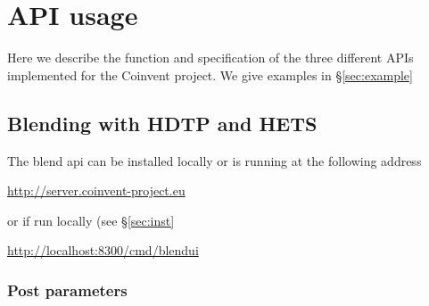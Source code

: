 \section{API usage}

Here we describe the function and specification of the three different APIs implemented for the Coinvent project. We give examples in \S\ref{sec:example}

\subsection{Blending with HDTP and HETS}



The blend api can be installed locally or is running at the following address
\begin{center}
\url{http://server.coinvent-project.eu}
\end{center}
\noindent or if run locally (see \S\ref{sec:inst}
\begin{center}
\url{http://localhost:8300/cmd/blendui}
\end{center}

\subsubsection{Post parameters}

